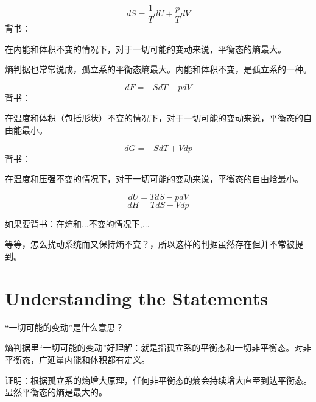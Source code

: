 \documentclass[CJK]{beamer}
\begin{document}
\begin{frame}
\bch
$$dS = \frac{1}{T} dU + \frac{p}{T} dV $$
背书：

在内能和体积不变的情况下，对于一切可能的变动来说，平衡态的熵最大。

\skiplines

熵判据也常常说成，孤立系的平衡态熵最大。内能和体积不变，是孤立系的一种。
\ech
\end{frame}


\begin{frame}
\bch
$$dF = -S dT - p dV $$
背书：

在温度和体积（包括形状）不变的情况下，对于一切可能的变动来说，平衡态的自由能最小。

\ech
\end{frame}


\begin{frame}
\bch
$$dG = -S dT + V dp$$
背书：

在温度和压强不变的情况下，对于一切可能的变动来说，平衡态的自由焓最小。

\ech
\end{frame}


\begin{frame}
\bch
$$dU = TdS - pdV$$
$$dH = TdS + Vdp $$

如果要背书：在熵和$\ldots$不变的情况下,$\ldots$

\skipline

等等，怎么扰动系统而又保持熵不变？，所以这样的判据虽然存在但并不常被提到。
\ech
\end{frame}


\section{Understanding the Statements}

\begin{frame}
\bch
“一切可能的变动”是什么意思？

\ech
\end{frame}

\begin{frame}
\bch
熵判据里“一切可能的变动”好理解：就是指孤立系的平衡态和一切非平衡态。对非平衡态，广延量内能和体积都有定义。



证明：根据孤立系的熵增大原理，任何非平衡态的熵会持续增大直至到达平衡态。显然平衡态的熵是最大的。

\ech
\end{frame}
\end{document}
